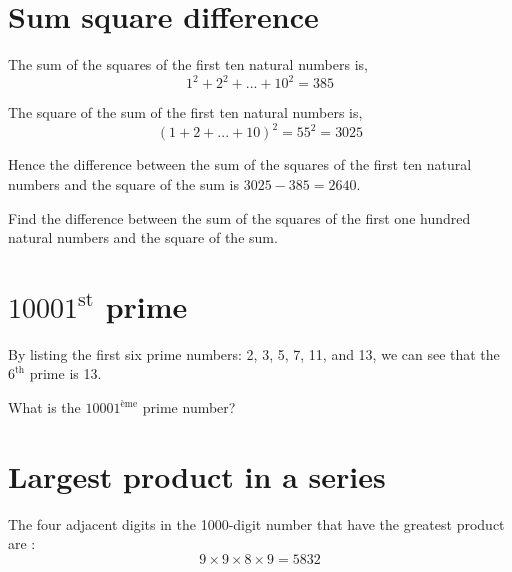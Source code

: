 \section{Sum square difference} \label{pb.006}
The sum of the squares of the first ten natural numbers is,
$$1^2 + 2^2 + ... + 10^2 = 385$$

The square of the sum of the first ten natural numbers is,
$$(1 + 2 + ... + 10)^2 = 55^2 = 3025$$

Hence the difference between the sum of the squares of the first ten natural numbers and the square of the sum is $3025 - 385 = 2640$.

Find the difference between the sum of the squares of the first one hundred natural numbers and the square of the sum.


\section{$10 001^{\text{st}}$ prime} \label{pb.007}
By listing the first six prime numbers: 2, 3, 5, 7, 11, and 13, we can see that the $6^{\text{th}}$ prime is 13.

What is the $10 001^{\text{ème}}$ prime number?


\section{Largest product in a series} \label{pb.008}
The four adjacent digits in the 1000-digit number that have the greatest product are :
$$9 \times 9 \times 8 \times 9 = 5832$$

